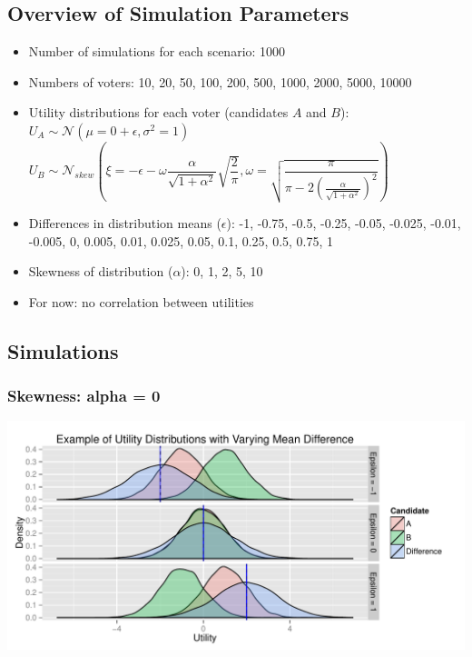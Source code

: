 \documentclass[12pt]{scrartcl}\usepackage[]{graphicx}\usepackage[]{color}
\makeatletter
\def\maxwidth{ %
  \ifdim\Gin@nat@width>\linewidth
    \linewidth
  \else
    \Gin@nat@width
  \fi
}
\newenvironment{knitrout}{}{} %
\makeatother
\begin{document}
\subsection{Overview of Simulation Parameters}
\begin{itemize}
\item Number of simulations for each scenario: 1000
\item Numbers of voters: 10, 20, 50, 100, 200, 500, 1000, 2000, 5000, 10000
\item Utility distributions for each voter (candidates $A$ and $B$): \\
$U_A \sim \mathcal{N}(\mu=0+\epsilon,\sigma^2=1)$ \\
$U_B \sim \mathcal{N}_{skew}\left(\xi=-\epsilon- \omega\dfrac{\alpha}{\sqrt{1+\alpha^2}}\sqrt{\dfrac{2}{\pi}},
\omega=\sqrt{\dfrac{\pi}{\pi-2\left(\tfrac{\alpha}{\sqrt{1+\alpha^2}}\right)^2}}\right)$
\item Differences in distribution means ($\epsilon$): -1, -0.75, -0.5, -0.25, -0.05, -0.025, -0.01, -0.005, 0, 0.005, 0.01, 0.025, 0.05, 0.1, 0.25, 0.5, 0.75, 1
\item Skewness of distribution ($\alpha$): 0, 1, 2, 5, 10
\item For now: no correlation between utilities
\end{itemize}

\clearpage
\subsection{Simulations}



\subsubsection{Skewness: alpha = 0}
\begin{knitrout}
\color{fgcolor}
\includegraphics[width=\maxwidth]{figure/unnamed-chunk-2} 

\end{knitrout}
\end{document}
